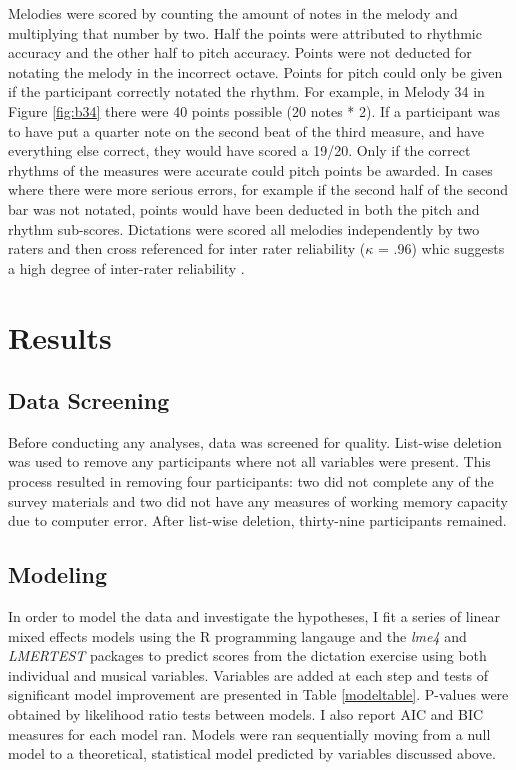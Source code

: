 \documentclass[12pt,]{book}
\begin{document}
Melodies were scored by counting the amount of notes in the melody and multiplying that number by two.
Half the points were attributed to rhythmic accuracy and the other
half to pitch accuracy.
Points were not deducted for notating the melody in the incorrect octave.
Points for pitch could only be given if the participant correctly notated the rhythm.
For example, in Melody 34 in Figure \ref{fig:b34} there were 40 points possible (20 notes * 2).
If a participant was to have put a quarter note on the second beat of the third measure, and have everything else correct, they would have scored a 19/20.
Only if the correct rhythms of the measures were accurate could pitch points be
awarded.
In cases where there were more serious errors, for example if the second half of the second bar was not notated, points would have been deducted in both the pitch and rhythm sub-scores.
Dictations were scored all melodies independently by two raters and then cross referenced for inter rater reliability (\(\kappa\) = .96) whic suggests a high degree of inter-rater reliability \citep{kooGuidelineSelectingReporting2016}.

\hypertarget{results-1}{%
\section{Results}\label{results-1}}

\hypertarget{data-screening}{%
\subsection{Data Screening}\label{data-screening}}

Before conducting any analyses, data was screened for quality.
List-wise deletion was used to remove any participants where not all variables were present.
This process resulted in removing four participants: two did not complete any of the survey materials and two did not have any measures of working memory capacity due to computer error.
After list-wise deletion, thirty-nine participants remained.

\hypertarget{modeling-1}{%
\subsection{Modeling}\label{modeling-1}}

In order to model the data and investigate the hypotheses, I fit a series of linear mixed effects models using the R programming langauge \citep{R-base} and the \emph{lme4} and \emph{LMERTEST} \citep{batesFittingLinearMixedEffects2015} packages to predict scores from the dictation exercise using both individual and musical variables.
Variables are added at each step and tests of significant model improvement are presented in Table \ref{modeltable}.
P-values were obtained by likelihood ratio tests between models.
I also report AIC and BIC measures for each model ran.
Models were ran sequentially moving from a null model to a theoretical, statistical model predicted by variables discussed above.
\end{document}
